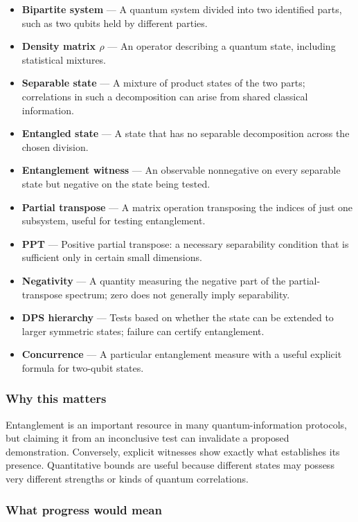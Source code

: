 \documentclass[
  11pt,
]{article}
\begin{document}
\begin{itemize}
\item
  \textbf{Bipartite system} --- A quantum system divided into two
  identified parts, such as two qubits held by different parties.
\item
  \textbf{Density matrix \ensuremath{\rho}} --- An operator describing a
  quantum state, including statistical mixtures.
\item
  \textbf{Separable state} --- A mixture of product states of the two
  parts; correlations in such a decomposition can arise from shared
  classical information.
\item
  \textbf{Entangled state} --- A state that has no separable
  decomposition across the chosen division.
\item
  \textbf{Entanglement witness} --- An observable nonnegative on every
  separable state but negative on the state being tested.
\item
  \textbf{Partial transpose} --- A matrix operation transposing the
  indices of just one subsystem, useful for testing entanglement.
\item
  \textbf{PPT} --- Positive partial transpose: a necessary separability
  condition that is sufficient only in certain small dimensions.
\item
  \textbf{Negativity} --- A quantity measuring the negative part of the
  partial-transpose spectrum; zero does not generally imply
  separability.
\item
  \textbf{DPS hierarchy} --- Tests based on whether the state can be
  extended to larger symmetric states; failure can certify entanglement.
\item
  \textbf{Concurrence} --- A particular entanglement measure with a
  useful explicit formula for two-qubit states.
\end{itemize}

\subsubsection{Why this matters}

Entanglement is an important resource in many quantum-information
protocols, but claiming it from an inconclusive test can invalidate a
proposed demonstration. Conversely, explicit witnesses show exactly what
establishes its presence. Quantitative bounds are useful because
different states may possess very different strengths or kinds of
quantum correlations.

\subsubsection{What progress would mean}
\end{document}
